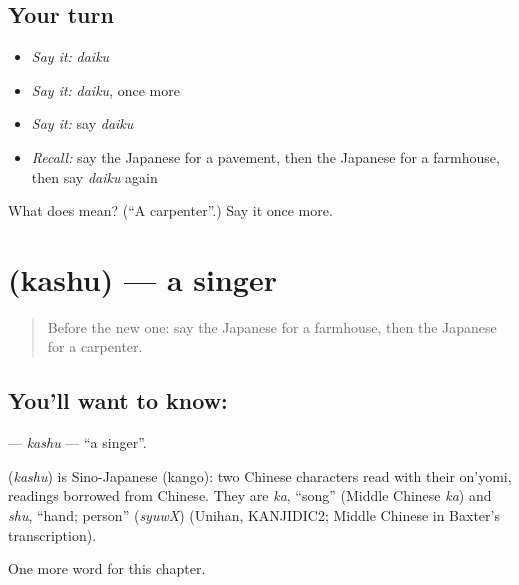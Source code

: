 \subsection*{Your turn}
\begin{itemize}
\raggedright
  \item \emph{Say it:} \emph{daiku}
  \item \emph{Say it:} \emph{daiku}, once more
  \item \emph{Say it:} say \emph{daiku}
  \item \emph{Recall:} say the Japanese for a pavement, then the Japanese for a farmhouse, then say \emph{daiku} again
\end{itemize}

\begin{tcolorbox}[breakable,colback=teal!4,colframe=teal!35!black,title={Before you move on}]
What does  mean? (\textquotedblleft{}A carpenter\textquotedblright{}.) Say it once more.
\end{tcolorbox}
\section[\texorpdfstring{\ja{かしゅ} (kashu)}{かしゅ (kashu)}]{ (kashu) — a singer}

\label{lesson:JA-C112-kashu}



\begin{quote}
Before the new one: say the Japanese for a farmhouse, then the Japanese for a carpenter.
\end{quote}

\subsection*{You'll want to know: }
\textbf{} — \emph{kashu} — \textquotedblleft{}a singer\textquotedblright{}.

\begin{cousinweb}
\textbf{} (\emph{kashu}) is Sino-Japanese (kango): two Chinese characters read with their on'yomi, readings borrowed from Chinese. They are \emph{ka}, \textquotedblleft{}song\textquotedblright{} (Middle Chinese \emph{ka}) and \emph{shu}, \textquotedblleft{}hand; person\textquotedblright{} (\emph{syuwX}) (Unihan, KANJIDIC2; Middle Chinese in Baxter's transcription).
\end{cousinweb}

\begin{grammarlens}[title={What you've built}]
One more word for this chapter.
\end{grammarlens}

